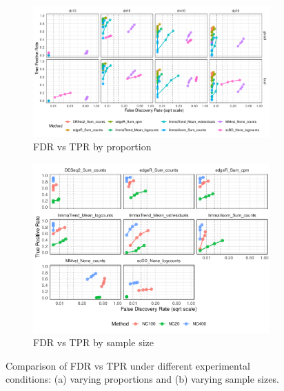\documentclass[a4paper, 11pt, twocolumn]{article}
\begin{document}
\begin{figure}[h]
	\centering
	\begin{subfigure}[t]{0.9\textwidth}
		\centering
		\includegraphics[width=\textwidth]{figs/fdrtpr_prop_method_Testis.pdf}
		\caption{FDR vs TPR by proportion}
		\label{fig:fdrtpr_prop_testis}
	\end{subfigure}
	
	\vspace{1em}
	
	\begin{subfigure}[t]{0.8\textwidth}
		\centering
		\includegraphics[width=\textwidth]{figs/fdrtpr_size_method_Testis.pdf}
		\caption{FDR vs TPR by sample size}
		\label{fig:fdrtpr_testis}
	\end{subfigure}
	
	\caption{Comparison of FDR vs TPR under different experimental conditions: (a) varying proportions and (b) varying sample sizes.}
	\label{fig:fdrtpr_combined_testis}
\end{figure}
\end{document}
